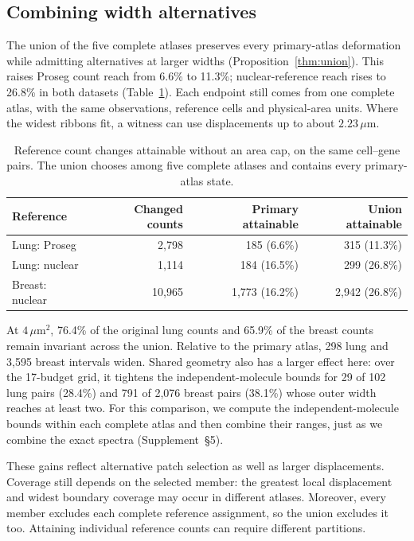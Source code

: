 \documentclass[10pt,letterpaper]{article}
\begin{document}
\FloatBarrier
\subsection{Combining width alternatives}\label{sec:alternatives}
The union of the five complete atlases preserves every primary-atlas deformation while admitting alternatives at larger widths (Proposition~\ref{thm:union}). This raises Proseg count reach from 6.6\% to 11.3\%; nuclear-reference reach rises to 26.8\% in both datasets (Table~\ref{tab:union-reach}). Each endpoint still comes from one complete atlas, with the same observations, reference cells and physical-area units. Where the widest ribbons fit, a witness can use displacements up to about $2.23\,\mu\mathrm m$.

\begin{table}[!htbp]\centering
\begin{tabular}{lrrr}\toprule
Reference&Changed counts&Primary attainable&Union attainable\\\midrule
Lung: Proseg&2,798&185 (6.6\%)&315 (11.3\%)\\
Lung: nuclear&1,114&184 (16.5\%)&299 (26.8\%)\\
Breast: nuclear&10,965&1,773 (16.2\%)&2,942 (26.8\%)\\\bottomrule
\end{tabular}
\caption{Reference count changes attainable without an area cap, on the same cell--gene pairs. The union chooses among five complete atlases and contains every primary-atlas state.}\label{tab:union-reach}
\end{table}

At $4\,\mu\mathrm m^2$, 76.4\% of the original lung counts and 65.9\% of the breast counts remain invariant across the union. Relative to the primary atlas, 298 lung and 3,595 breast intervals widen. Shared geometry also has a larger effect here: over the 17-budget grid, it tightens the independent-molecule bounds for 29 of 102 lung pairs (28.4\%) and 791 of 2,076 breast pairs (38.1\%) whose outer width reaches at least two. For this comparison, we compute the independent-molecule bounds within each complete atlas and then combine their ranges, just as we combine the exact spectra (Supplement~\S5).

These gains reflect alternative patch selection as well as larger displacements. Coverage still depends on the selected member: the greatest local displacement and widest boundary coverage may occur in different atlases. Moreover, every member excludes each complete reference assignment, so the union excludes it too. Attaining individual reference counts can require different partitions.
\end{document}
